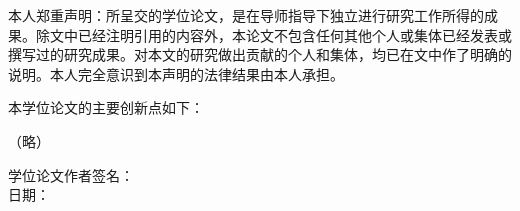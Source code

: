 \begin{center}
\end{center}

\vspace{7mm}
本人郑重声明：所呈交的学位论文，是在导师指导下独立进行研究工作所得的成果。除文中已经注明引用的内容外，本论文不包含任何其他个人或集体已经发表或撰写过的研究成果。对本文的研究做出贡献的个人和集体，均已在文中作了明确的说明。本人完全意识到本声明的法律结果由本人承担。\par
本学位论文的主要创新点如下：

\par
（略）\par





\vspace{20mm}

\begin{flushright}
	学位论文作者签名：\qquad\qquad\qquad\qquad\qquad\qquad\qquad
	\\
	\vspace{7mm}
	日期：\qquad\qquad\qquad\qquad\qquad\qquad\qquad
\end{flushright}